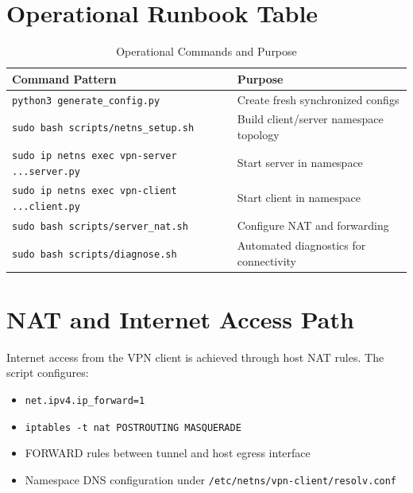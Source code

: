 \section{Operational Runbook Table}
\begin{table}[H]
\centering
\caption{Operational Commands and Purpose}
\begin{tabular}{p{}p{}}
\toprule
\textbf{Command Pattern} & \textbf{Purpose} \\
\midrule
\texttt{python3 generate\_config.py} & Create fresh synchronized configs \\
\texttt{sudo bash scripts/netns\_setup.sh} & Build client/server namespace topology \\
\texttt{sudo ip netns exec vpn-server ...server.py} & Start server in namespace \\
\texttt{sudo ip netns exec vpn-client ...client.py} & Start client in namespace \\
\texttt{sudo bash scripts/server\_nat.sh} & Configure NAT and forwarding \\
\texttt{sudo bash scripts/diagnose.sh} & Automated diagnostics for connectivity \\
\bottomrule
\end{tabular}
\end{table}

\section{NAT and Internet Access Path}
Internet access from the VPN client is achieved through host NAT rules. The script configures:
\begin{itemize}[leftmargin=2em]
\item \texttt{net.ipv4.ip\_forward=1}
\item \texttt{iptables -t nat POSTROUTING MASQUERADE}
\item FORWARD rules between tunnel and host egress interface
\item Namespace DNS configuration under \texttt{/etc/netns/vpn-client/resolv.conf}
\end{itemize}

